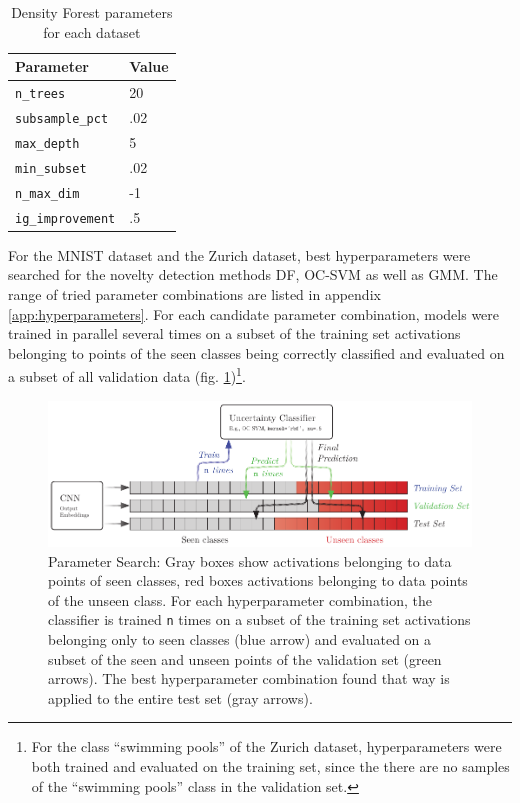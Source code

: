 \documentclass[10pt]{article}
\begin{document}
\begin{table}[H]
    \centering
    \small
    \begin{tabular}{ll}
        \toprule
        Parameter & Value \\ \midrule
        \texttt{n\_trees} & 20  \\
        \texttt{subsample\_pct} & .02  \\
        \texttt{max\_depth} & 5 \\
        \texttt{min\_subset} & .02 \\
        \texttt{n\_max\_dim} & -1 \\
        \texttt{ig\_improvement} & .5 \\\bottomrule
    \end{tabular}
    \caption{Density Forest parameters for each dataset}
    \label{table:synthetic-parameters}
\end{table}

For the MNIST dataset and the Zurich dataset, best hyperparameters were searched for the novelty detection methods \acrlong{DF}, \gls{OC-SVM} as well as \gls{GMM}. The range of tried parameter combinations are listed in appendix \ref{app:hyperparameters}. For each candidate parameter combination, models were trained in parallel several times on a subset of the training set activations belonging to points of the seen classes being correctly classified and evaluated on a subset of all validation data (fig. \ref{fig:hyperparameter-search})\footnote{For the class ``swimming pools'' of the Zurich dataset, hyperparameters were both trained and evaluated on the training set, since the there are no samples of the ``swimming pools'' class in the validation set.}.

\begin{figure}[H]
    \centering
    \includegraphics[width=\textwidth]{schema_parameter_search}
    \caption{Parameter Search: Gray boxes show activations belonging to data points of seen classes, red boxes activations belonging to data points of the unseen class. For each hyperparameter combination, the classifier is trained \texttt{n} times on a subset of the training set activations belonging only to seen classes (blue arrow) and evaluated on a subset of the seen and unseen points of the validation set (green arrows). The best hyperparameter combination found that way is applied to the entire test set (gray arrows).}
    \label{fig:hyperparameter-search}
\end{figure}
\end{document}
